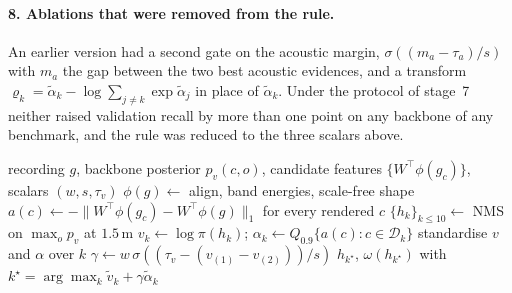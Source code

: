 \paragraph{8. Ablations that were removed from the rule.}
An earlier version had a second gate on the acoustic margin, $\sigma((m_a -
\tau_a)/s)$ with $m_a$ the gap between the two best acoustic evidences, and a
transform $\varrho_k = \tilde\alpha_k - \log\sum_{j \ne k}\exp\tilde\alpha_j$ in
place of $\tilde\alpha_k$. Under the protocol of stage~7 neither raised
validation recall by more than one point on any backbone of any benchmark, and
the rule was reduced to the three scalars above.

\begin{algorithm}[t]
\caption{Acoustic verification of visual hypotheses}
\begin{algorithmic}[1]
\Require recording $g$, backbone posterior $p_v(c,o)$, candidate features $\{W^{\!\top}\phi(g_c)\}$, scalars $(w, s, \tau_v)$
\State $\phi(g) \gets$ align, band energies, scale-free shape 
\State $a(c) \gets -\|W^{\!\top}\phi(g_c) - W^{\!\top}\phi(g)\|_1$ for every rendered $c$ 
\State $\{h_k\}_{k \le 10} \gets$ NMS on $\max_o p_v$ at $1.5$\,m 
\State $v_k \gets \log \pi(h_k)$;\; $\alpha_k \gets Q_{0.9}\{a(c): c \in \mathcal{D}_k\}$ 
\State standardise $v$ and $\alpha$ over $k$
\State $\gamma \gets w\,\sigma((\tau_v - (v_{(1)} - v_{(2)}))/s)$ 
\State \Return $h_{k^\star}$, $\omega(h_{k^\star})$ with $k^\star = \arg\max_k \tilde v_k + \gamma \tilde\alpha_k$
\end{algorithmic}
\end{algorithm}
